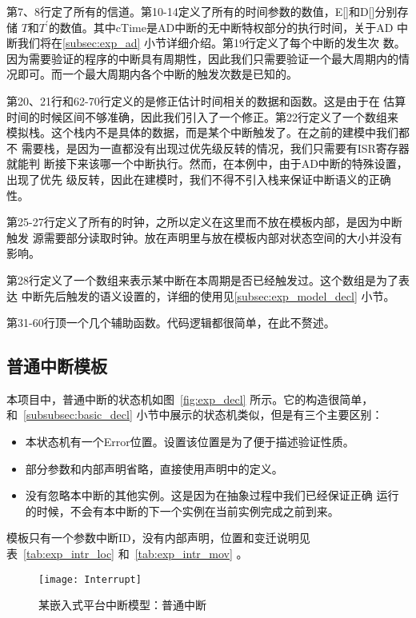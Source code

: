 第7、8行定了所有的信道。第10-14定义了所有的时间参数的数值，E[]和D[]分别存储
$T$和$T^\prime$的数值。其中cTime是AD中断的无中断特权部分的执行时间，关于AD
中断我们将在\ref{subsec:exp_ad} 小节详细介绍。第19行定义了每个中断的发生次
数。因为需要验证的程序的中断具有周期性，因此我们只需要验证一个最大周期内的情
况即可。而一个最大周期内各个中断的触发次数是已知的。

第20、21行和62-70行定义的是修正估计时间相关的数据和函数。这是由于\uppaal 在
估算时间的时候区间不够准确，因此我们引入了一个修正。第22行定义了一个数组来
模拟栈。这个栈内不是具体的数据，而是某个中断触发了。在之前的建模中我们都不
需要栈，是因为一直都没有出现过优先级反转的情况，我们只需要有ISR寄存器就能判
断接下来该哪一个中断执行。然而，在本例中，由于AD中断的特殊设置，出现了优先
级反转，因此在建模时，我们不得不引入栈来保证中断语义的正确性。

第25-27行定义了所有的时钟，之所以定义在这里而不放在模板内部，是因为中断触发
源需要部分读取时钟。放在声明里与放在模板内部对状态空间的大小并没有影响。

第28行定义了一个数组来表示某中断在本周期是否已经触发过。这个数组是为了表达
中断先后触发的语义设置的，详细的使用见\ref{subsec:exp_model_decl} 小节。

第31-60行顶一个几个辅助函数。代码逻辑都很简单，在此不赘述。

\subsection{普通中断模板}
\label{subsec:exp_intr}

本项目中，普通中断的状态机如图~\ref{fig:exp_decl} 所示。它的构造很简单，
和~\ref{subsubsec:basic_decl} 小节中展示的状态机类似，但是有三个主要区别：

\begin{itemize}
	\item 本状态机有一个Error位置。设置该位置是为了便于描述验证性质。
	\item 部分参数和内部声明省略，直接使用声明中的定义。
	\item 没有忽略本中断的其他实例。这是因为在抽象过程中我们已经保证正确
	运行的时候，不会有本中断的下一个实例在当前实例完成之前到来。
\end{itemize}

模板只有一个参数\pozhehao 中断ID，没有内部声明，位置和变迁说明见
表~\ref{tab:exp_intr_loc} 和~\ref{tab:exp_intr_mov} 。

\begin{figure}[H]
	\centering
	\texttt{[image: Interrupt]}
	\caption{某嵌入式平台中断模型：普通中断}
	\label{fig:exp_intr}
\end{figure}

